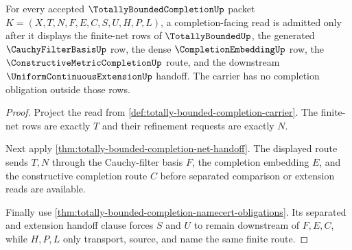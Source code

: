 \begin{theorem}
\label{thm:totally-bounded-completion-finite-net-completion-obligations}
For every accepted $\TotallyBoundedCompletionUp$ packet $K=(X,T,N,F,E,C,S,U,H,P,L)$, a completion-facing read is admitted only after it displays the finite-net rows of $\TotallyBoundedUp$, the generated $\CauchyFilterBasisUp$ row, the dense $\CompletionEmbeddingUp$ row, the $\ConstructiveMetricCompletionUp$ route, and the downstream $\UniformContinuousExtensionUp$ handoff. The carrier has no completion obligation outside those rows.
\end{theorem}
\begin{proof}
Project the read from \autoref{def:totally-bounded-completion-carrier}. The finite-net rows are exactly $T$ and their refinement requests are exactly $N$.

Next apply \autoref{thm:totally-bounded-completion-net-handoff}. The displayed route sends $T,N$ through the Cauchy-filter basis $F$, the completion embedding $E$, and the constructive completion route $C$ before separated comparison or extension reads are available.

Finally use \autoref{thm:totally-bounded-completion-namecert-obligations}. Its separated and extension handoff clause forces $S$ and $U$ to remain downstream of $F,E,C$, while $H,P,L$ only transport, source, and name the same finite route.
\end{proof}

